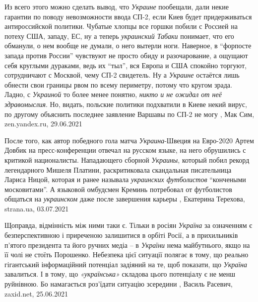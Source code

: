 Из всего этого можно сделать вывод, что \emph{Украине} пообещали, дали некие гарантии
по поводу невозможности ввода СП-2, если Киев будет придерживаться
антироссийской политики. Чубатые хлопцы все горшки побили с Россией на потеху
США, западу, ЕС, ну а теперь \emph{украинский Табаки} понимает, что его обманули, о
нем вообще не думали, о него вытерли ноги. Наверное, в \enquote{форпосте запада против
России} чувствуют не просто обиду и разочарование, а ощущают себя круглыми
дураками, ведь их \enquote{тыл}, вся Европа и США спокойно торгуют, сотрудничают с
Москвой, чему СП-2 свидетель. Ну а \emph{Украине} остаётся лишь обнести свои границы
рвом по всему периметру, потому что кругом зрада.  Ладно, с \emph{Украиной} то более
менее понятно, \emph{никто и не ожидал от неё здравомыслия}. Но, видать, польские
политики подхватили в Киеве некий вирус, по другому объяснить последнее
заявление Варшавы по СП-2 не могу
, 
Мак Сим, zen.yandex.ru, 29.06.2021

После того, как автор победного гола матча \emph{Украина}-Швеция на Евро-2020 Артем
Довбик на пресс-конференции отвечал на русском языке, на него обрушились с
критикой националисты.  Нападающего сборной \emph{Украины}, который побил
рекорд легендарного Мишеля Платини, раскритиковала скандальная писательница
Лариса Ницой, которая и ранее называла \emph{украинских футболистов}
\enquote{кончеными московитами}. А языковой омбудсмен Креминь потребовал от
футболистов общаться на \emph{украинском} даже после завершения карьеры
, 
Екатерина Терехова, strana.ua, 03.07.2021

Щоправда, відмінність між ними таки є. Тільки в росіян \emph{Україна} за
означенням є безперспективною і приреченою залишитися в орбіті Росії, а в
прихильників п’ятого президента та його ручних медіа – в \emph{України} нема
майбутнього, якщо на її чолі не стоїть Порошенко. Небезпека цієї ситуації
полягає в тому, що реально гігантський інформаційний потенціал задіяний на те,
щоб показати, що \emph{Україна} завалиться. І в тому, що \emph{«українська»}
складова цього потенціалу є не менш руйнівною. Бо намагається роз’їдати
ситуацію зсередини
, Василь Расевич, zaxid.net, 25.06.2021


